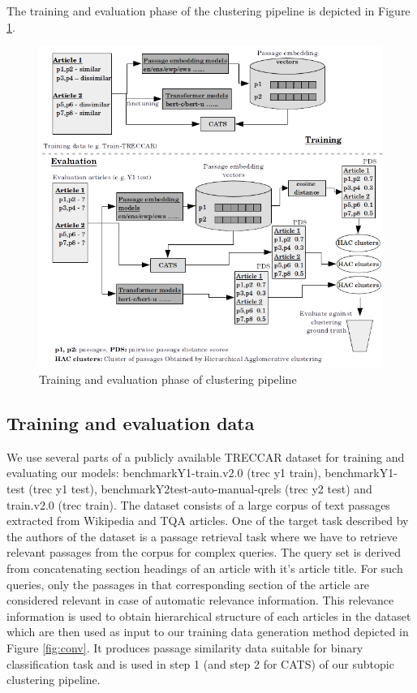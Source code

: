The training and evaluation phase of the clustering pipeline is depicted in Figure \ref{fig:pipe}.
\begin{figure}[h]
  \centering
  \includegraphics[width=\linewidth]{graphics/pipeline2.png}
  \caption{Training and evaluation phase of clustering pipeline}
  \label{fig:pipe}
\end{figure}

\subsection{Training and evaluation data} We use several parts of a publicly available TRECCAR dataset for training and evaluating our models: benchmarkY1-train.v2.0 (trec y1 train), benchmarkY1-test (trec y1 test), benchmarkY2test-auto-manual-qrels (trec y2 test) and train.v2.0 (trec train). The dataset consists of a large corpus of text passages extracted from Wikipedia and TQA articles. One of the target task described by the authors of the dataset is a passage retrieval task where we have to retrieve relevant passages from the corpus for complex queries. The query set is derived from concatenating section headings of an article with it's article title. For such queries, only the passages in that corresponding section of the article are considered relevant in case of automatic relevance information. This relevance information is used to obtain hierarchical structure of each articles in the dataset which are then used as input to our training data generation method depicted in Figure \ref{fig:conv}. It produces passage similarity data suitable for binary classification task and is used in step 1 (and step 2 for CATS) of our subtopic clustering pipeline.

